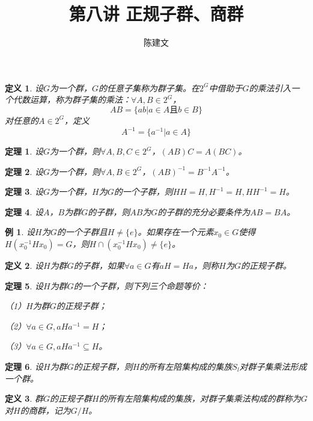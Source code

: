 \documentclass{article}
\newtheorem{Def}{定义}
\newtheorem{Thm}{定理}
\newtheorem*{Example}{例}
\begin{document}
\begin{CJK*}{UTF8}{gbsn}
  \title{第八讲 正规子群、商群}
  \author{陈建文}
  \maketitle
  

\begin{Def}
  设$G$为一个群，$G$的任意子集称为群子集。在$2^G$中借助于$G$的乘法引入一个代数运算，称为群子集的乘法：$\forall A,B\in 2^G$，
  \[AB=\{ab|a\in A \text{且} b\in B\}\]
  对任意的$A\in 2^G$，定义
\[A^{-1}=\{a^{-1}|a\in A\}\]
\end{Def}

\begin{Thm}
  设$G$为一个群，则$\forall A,B,C\in 2^G$，$(AB)C=A(BC)$。
\end{Thm}

\begin{Thm}
  设$G$为一个群，则$\forall A,B\in 2^G$，$(AB)^{-1}=B^{-1}A^{-1}$。
\end{Thm}

\begin{Thm}
  设$G$为一个群，$H$为$G$的一个子群，则$HH=H,H^{-1}=H,HH^{-1}=H$。
\end{Thm}

\begin{Thm}
设$A$，$B$为群$G$的子群，则$AB$为$G$的子群的充分必要条件为$AB=BA$。
\end{Thm}

\begin{Example}
设$H$为$G$的一个子群且$H\neq \{e\}$。如果存在一个元素$x_0\in G$使得$H(x_0^{-1}Hx_0)=G$，则$H\cap (x_0^{-1}Hx_0)\neq \{e\}$。
\end{Example}

\begin{Def}
  设$H$为群$G$的子群，如果$\forall a\in G$有$aH=Ha$，则称$H$为$G$的正规子群。
\end{Def}
\begin{Thm}
 设$H$为群$G$的一个子群，则下列三个命题等价：

 （1）$H$为群$G$的正规子群；

 （2）$\forall a\in G, aHa^{-1}=H$；

 （3）$\forall a\in G, aHa^{-1}\subseteq H$。
\end{Thm}

\begin{Thm}
设$H$为群$G$的正规子群，则$H$的所有左陪集构成的集族$S_l$对群子集乘法形成一个群。
\end{Thm}
\begin{Def}
  群$G$的正规子群$H$的所有左陪集构成的集族，对群子集乘法构成的群称为$G$对$H$的商群，记为$G/H$。
\end{Def}



\end{CJK*}
\end{document}
